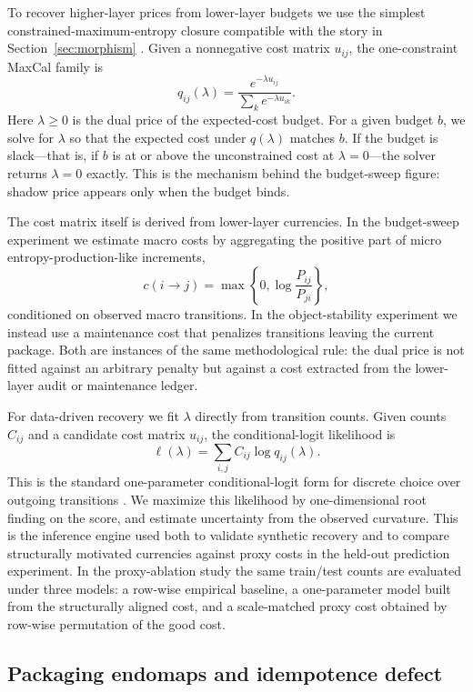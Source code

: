To recover higher-layer prices from lower-layer budgets we use the simplest constrained-maximum-entropy closure compatible with the story in Section~\ref{sec:morphism} \cite{jaynes1957information,presse2013maxent}. Given a nonnegative cost matrix \(u_{ij}\), the one-constraint MaxCal family is
\[
q_{ij}(\lambda)=\frac{e^{-\lambda u_{ij}}}{\sum_k e^{-\lambda u_{ik}}}.
\]
Here \(\lambda\ge 0\) is the dual price of the expected-cost budget. For a given budget \(b\), we solve for \(\lambda\) so that the expected cost under \(q(\lambda)\) matches \(b\). If the budget is slack---that is, if \(b\) is at or above the unconstrained cost at \(\lambda=0\)---the solver returns \(\lambda=0\) exactly. This is the mechanism behind the budget-sweep figure: shadow price appears only when the budget binds.

The cost matrix itself is derived from lower-layer currencies. In the budget-sweep experiment we estimate macro costs by aggregating the positive part of micro entropy-production-like increments,
\[
c(i\to j)=\max\left\{0,\log\frac{P_{ij}}{P_{ji}}\right\},
\]
conditioned on observed macro transitions. In the object-stability experiment we instead use a maintenance cost that penalizes transitions leaving the current package. Both are instances of the same methodological rule: the dual price is not fitted against an arbitrary penalty but against a cost extracted from the lower-layer audit or maintenance ledger.

For data-driven recovery we fit \(\lambda\) directly from transition counts. Given counts \(C_{ij}\) and a candidate cost matrix \(u_{ij}\), the conditional-logit likelihood is
\[
\ell(\lambda)=\sum_{i,j} C_{ij}\log q_{ij}(\lambda).
\]
This is the standard one-parameter conditional-logit form for discrete choice over outgoing transitions \cite{mcfadden1974conditional}.
We maximize this likelihood by one-dimensional root finding on the score, and estimate uncertainty from the observed curvature. This is the inference engine used both to validate synthetic recovery and to compare structurally motivated currencies against proxy costs in the held-out prediction experiment. In the proxy-ablation study the same train/test counts are evaluated under three models: a row-wise empirical baseline, a one-parameter model built from the structurally aligned cost, and a scale-matched proxy cost obtained by row-wise permutation of the good cost.

\subsection{Packaging endomaps and idempotence defect}


